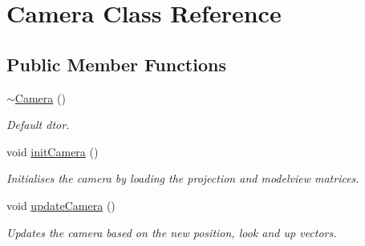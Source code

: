 \hypertarget{classCamera}{
\section{Camera Class Reference}
\label{classCamera}
}
\subsection*{Public Member Functions}
\begin{DoxyCompactItemize}
\item 
\hypertarget{classCamera_ad1897942d0ccf91052386388a497349f}{
\hyperlink{classCamera_ad1897942d0ccf91052386388a497349f}{$\sim$Camera} ()}
\label{classCamera_ad1897942d0ccf91052386388a497349f}

\begin{DoxyCompactList}\small\item\em Default dtor. \item\end{DoxyCompactList}\item 
\hypertarget{classCamera_a96055e05a5fca53c6e40d8a157371bec}{
void \hyperlink{classCamera_a96055e05a5fca53c6e40d8a157371bec}{initCamera} ()}
\label{classCamera_a96055e05a5fca53c6e40d8a157371bec}

\begin{DoxyCompactList}\small\item\em Initialises the camera by loading the projection and modelview matrices. \item\end{DoxyCompactList}\item 
\hypertarget{classCamera_aa67fdde5001bb777ad917c3a1a40fd60}{
void \hyperlink{classCamera_aa67fdde5001bb777ad917c3a1a40fd60}{updateCamera} ()}
\label{classCamera_aa67fdde5001bb777ad917c3a1a40fd60}

\begin{DoxyCompactList}\small\item\em Updates the camera based on the new position, look and up vectors. \item\end{DoxyCompactList}\end{DoxyCompactItemize}
